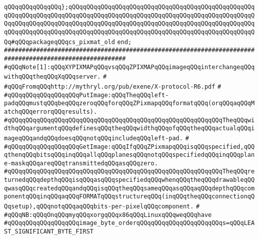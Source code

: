 \newline
\verb|qQQqqQQqqQQqqQQq};qQQqqQQqqQQqqQQqqQQqqQQqqQQqqQQqqQQqqQQqqQQqqQQqqQQqqQQqqQQqqQQqqQQqqQQqqQQqqQQqqQQqqQQqqQQqqQQqqQQqqQQqqQQqqQQqqQQqqQQqqQQqqQQqqQQqqQQqqQQqqQQqqQQqqQQqqQQqqQQqqQQqqQQqqQQqqQQqqQQqqQQqqQQqqQQqqQQqqQQqqQQqqQQqqQQqqQQqqQQqqQQqqQQqqQQqqQQqqQQqqQQqqQQqqQQqqQQqqQQqqQQq#qQQqpackageqQQqcs_pixmat_old|\newline
\newline
\verb|end;|\newline
\newline
\newline
\verb|########################################################################################################|\newline
\verb|#qQQqNote[1]:qQQqXYPIXMAPqQQqvsqQQqZPIXMAPqQQqimageqQQqinterchangeqQQqwithqQQqtheqQQqXqQQqserver.|\newline
\verb|#|\newline
\verb|#qQQqFromqQQqhttp://mythryl.org/pub/exene/X-protocol-R6.pdf|\newline
\verb|#|\newline
\verb|#qQQqqQQqqQQqqQQqqQQqPutImage:qQQqTheqQQqleft-padqQQqmustqQQqbeqQQqzeroqQQqforqQQqZPixmapqQQqformatqQQq(orqQQqaqQQqMatchqQQqerrorqQQqresults).|\newline
\verb|#qQQqqQQqqQQqqQQqqQQqqQQqqQQqqQQqqQQqqQQqqQQqqQQqqQQqqQQqqQQqTheqQQqwidthqQQqargumentqQQqdefinesqQQqtheqQQqwidthqQQqofqQQqtheqQQqactualqQQqimageqQQqandqQQqdoesqQQqnotqQQqincludeqQQqleft-pad.|\newline
\verb|#|\newline
\verb|#qQQqqQQqqQQqqQQqqQQqGetImage:qQQqIfqQQqZPixmapqQQqisqQQqspecified,qQQqthenqQQqbitsqQQqinqQQqallqQQqplanesqQQqnotqQQqspecifiedqQQqinqQQqplane-maskqQQqareqQQqtransmittedqQQqasqQQqzero.|\newline
\verb|#qQQqqQQqqQQqqQQqqQQqqQQqqQQqqQQqqQQqqQQqqQQqqQQqqQQqqQQqqQQqTheqQQqreturnedqQQqdepthqQQqisqQQqasqQQqspecifiedqQQqwhenqQQqtheqQQqdrawableqQQqwasqQQqcreatedqQQqandqQQqisqQQqtheqQQqsameqQQqasqQQqaqQQqdepthqQQqcomponentqQQqinqQQqaqQQqFORMATqQQqstructureqQQq(inqQQqtheqQQqconnectionqQQqsetup),qQQqnotqQQqaqQQqbits-per-pixelqQQqcomponent.|\newline
\verb|#|\newline
\verb|#qQQqNB:qQQqOnqQQqmyqQQqxorgqQQqx86qQQqLinuxqQQqweqQQqhave|\newline
\verb|#qQQqqQQqqQQqqQQqqQQqimage_byte_orderqQQqqQQqqQQqqQQqqQQqqQQqs=qQQqLEAST_SIGNIFICANT_BYTE_FIRST|\newline
